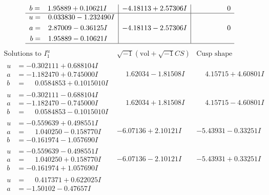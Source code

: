\documentclass[1p]{elsarticle_modified}
\theoremstyle{definition}
\newcommand{\I}{\sqrt{-1}}
\begin{document}
$$\begin{array}{c|c|c}
\begin{aligned}
b &= \phantom{-}1.95889 + 0.10621 I\end{aligned}
 & -4.18113 + 2.57306 I & \phantom{-0.000000 } 0 \\ \hline\begin{aligned}
u &= \phantom{-}0.033830 - 1.232490 I \\
a &= \phantom{-}2.87009 - 0.36125 I \\
b &= \phantom{-}1.95889 - 0.10621 I\end{aligned}
 & -4.18113 - 2.57306 I & \phantom{-0.000000 } 0\\
 \hline 
 \end{array}$$\newpage$$\begin{array}{c|c|c}  
\text{Solutions to }I^u_{1}& \I (\text{vol} + \sqrt{-1}CS) & \text{Cusp shape}\\
 \hline 
\begin{aligned}
u &= -0.302111 + 0.688104 I \\
a &= -1.182470 + 0.745000 I \\
b &= \phantom{-}0.0584853 + 0.1015010 I\end{aligned}
 & \phantom{-}1.62034 - 1.81508 I & \phantom{-}4.15715 + 4.60801 I \\ \hline\begin{aligned}
u &= -0.302111 - 0.688104 I \\
a &= -1.182470 - 0.745000 I \\
b &= \phantom{-}0.0584853 - 0.1015010 I\end{aligned}
 & \phantom{-}1.62034 + 1.81508 I & \phantom{-}4.15715 - 4.60801 I \\ \hline\begin{aligned}
u &= -0.559639 + 0.498551 I \\
a &= \phantom{-}1.040250 - 0.158770 I \\
b &= -0.161974 - 1.057690 I\end{aligned}
 & -6.07136 + 2.10121 I & -5.43931 - 0.33251 I \\ \hline\begin{aligned}
u &= -0.559639 - 0.498551 I \\
a &= \phantom{-}1.040250 + 0.158770 I \\
b &= -0.161974 + 1.057690 I\end{aligned}
 & -6.07136 - 2.10121 I & -5.43931 + 0.33251 I \\ \hline\begin{aligned}
u &= \phantom{-}0.417371 + 0.622025 I \\
a &= -1.50102 - 0.47657 I \\

\end{aligned}
\end{array}$$
\end{document}
